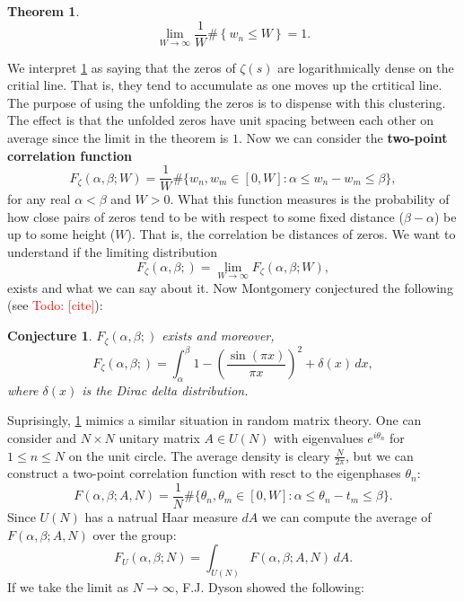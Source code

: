 \documentclass[12pt]{book}
\newtheorem{theorem}{Theorem}[section]
\newtheorem{conjecture}{Conjecture}[section]
\theoremstyle{definition}\newframedtheorem{method}{Method}
\renewcommand{\a}{\alpha}
\renewcommand{\b}{\beta}
\renewcommand{\d}{\delta}
\newcommand{\z}{\zeta}
\renewcommand{\t}{\theta}
\newcommand{\x}{\times}
\newcommand{\<}{\langle}
\renewcommand{\>}{\rangle}
\newcommand{\todo}[1]{\textcolor{red}{\sf Todo: [#1]}}
\begin{document}
      \begin{theorem}\label{thm:zeros_of_zeta_are_log_dense}
      \phantom{ }
      \[
        \lim_{W \to \infty}\frac{1}{W}\#\left\{w_{n} \le W\right\} = 1.
      \]
      \end{theorem}

      We interpret \cref{thm:zeros_of_zeta_are_log_dense} as saying that the zeros of $\z(s)$ are logarithmically dense on the critial line. That is, they tend to accumulate as one moves up the crtitical line. The purpose of using the unfolding the zeros is to dispense with this clustering. The effect is that the unfolded zeros have unit spacing between each other on average since the limit in the theorem is $1$. Now we can consider the \textbf{two-point correlation function}
      \[
        F_{\z}(\a,\b;W) = \frac{1}{W}\#\{w_{n},w_{m} \in [0,W]:\a \le w_{n}-w_{m} \le \b\},
      \]
      for any real $\a < \b$ and $W > 0$. What this function measures is the probability of how close pairs of zeros tend to be with respect to some fixed distance ($\b-\a$) be up to some height ($W$). That is, the correlation be distances of zeros. We want to understand if the limiting distribution
      \[
        F_{\z}(\a,\b;) = \lim_{W \to \infty}F_{\z}(\a,\b;W),
      \]
      exists and what we can say about it. Now Montgomery conjectured the following (see \todo{cite}):

      \begin{conjecture}\label{conj:Montgomery_distribution_of_zeros_of_zeta}
      $F_{\z}(\a,\b;)$ exists and moreover,
      \[
        F_{\z}(\a,\b;) = \int_{\a}^{\b}1-\left(\frac{\sin(\pi x)}{\pi x}\right)^{2}+\d(x)\,dx,
      \]
      where $\d(x)$ is the Dirac delta distribution. 
      \end{conjecture}        
        Suprisingly, \cref{conj:Montgomery_distribution_of_zeros_of_zeta} mimics a similar situation in random matrix theory. One can consider and $N \x N$ unitary matrix $A \in U(N)$ with eigenvalues $e^{i\t_{n}}$ for $1 \le n \le N$ on the unit circle. The average density is cleary $\frac{N}{2\pi}$, but we can construct a two-point correlation function with resct to the eigenphases $\t_{n}$:
      \[
        F(\a,\b;A,N) = \frac{1}{N}\#\{\t_{n},\t_{m} \in [0,W]:\a \le \t_{n}-t_{m} \le \b\}.
      \]
      Since $U(N)$ has a natrual Haar measure $dA$ we can compute the average of $F(\a,\b;A,N)$ over the group:
      \[
        F_{U}(\a,\b;N) = \int_{U(N)}F(\a,\b;A,N)\,dA.
      \]
      If we take the limit as $N \to \infty$, F.J. Dyson showed the following:
\end{document}
